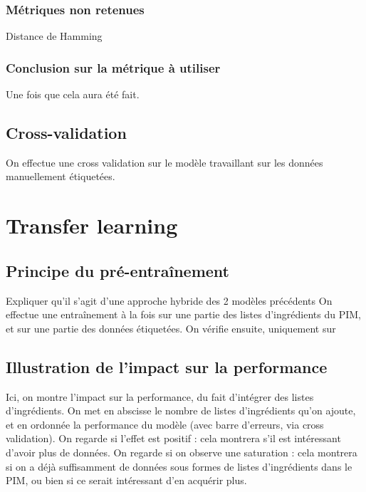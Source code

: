             \subsection{Métriques non retenues}
            Distance de Hamming

            \subsection{Conclusion sur la métrique à utiliser}
            Une fois que cela aura été fait.


        \section{Cross-validation}
            
        On effectue une cross validation sur le modèle travaillant sur les données manuellement étiquetées.    
        
    \chapter{Transfer learning}
        
        \section{Principe du pré-entraînement}
        
        Expliquer qu'il s'agit d'une approche hybride des 2 modèles précédents
        On effectue une entraînement à la fois sur une partie des listes d'ingrédients du PIM, et sur une partie des données étiquetées.
        On vérifie ensuite, uniquement sur 

        \section{Illustration de l'impact sur la performance}

        Ici, on montre l'impact sur la performance, du fait d'intégrer des listes d'ingrédients.
        On met en abscisse le nombre de listes d'ingrédients qu'on ajoute, et en ordonnée la performance du modèle (avec barre d'erreurs, via cross validation).
        On regarde si l'effet est positif : cela montrera s'il est intéressant d'avoir plus de données.
        On regarde si on observe une saturation : cela montrera si on a déjà suffisamment de données sous formes de listes d'ingrédients dans le PIM, ou bien si ce serait intéressant d'en acquérir plus.

